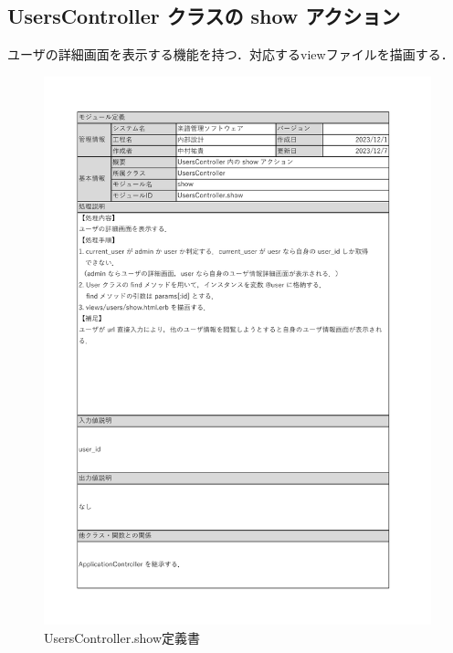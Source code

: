 \subsection*{UsersController クラスの show アクション}
ユーザの詳細画面を表示する機能を持つ．対応するviewファイルを描画する．
\begin{figure}[H]
	\centering
	\includegraphics[scale=0.5]{img/Users/xlsx/UsersController_show.pdf}
	\vspace{-0.3cm}
	\caption{UsersController.show定義書}
\end{figure}
